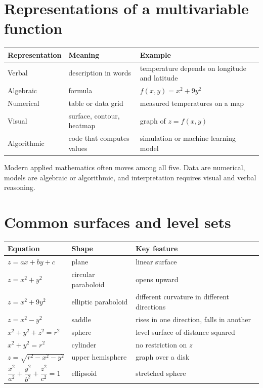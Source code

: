 \documentclass[11pt]{article}
\begin{document}
\section{Representations of a multivariable function}

\begin{center}
\begin{tabular}{@{}>{\raggedright\arraybackslash}p{}>{\raggedright\arraybackslash}p{}>{\raggedright\arraybackslash}p{}@{}}
\toprule
Representation & Meaning & Example \\
\midrule
Verbal & description in words & temperature depends on longitude and latitude \\
Algebraic & formula & $f(x,y)=x^2+9y^2$ \\
Numerical & table or data grid & measured temperatures on a map \\
Visual & surface, contour, heatmap & graph of $z=f(x,y)$ \\
Algorithmic & code that computes values & simulation or machine learning model \\
\bottomrule
\end{tabular}
\end{center}

Modern applied mathematics often moves among all five. Data are numerical, models are algebraic or algorithmic, and interpretation requires visual and verbal reasoning.

\section{Common surfaces and level sets}

\begin{center}
\begin{tabular}{@{}lll@{}}
\toprule
Equation & Shape & Key feature \\
\midrule
$z=ax+by+c$ & plane & linear surface \\
$z=x^2+y^2$ & circular paraboloid & opens upward \\
$z=x^2+9y^2$ & elliptic paraboloid & different curvature in different directions \\
$z=x^2-y^2$ & saddle & rises in one direction, falls in another \\
$x^2+y^2+z^2=r^2$ & sphere & level surface of distance squared \\
$x^2+y^2=r^2$ & cylinder & no restriction on $z$ \\
$z=\sqrt{r^2-x^2-y^2}$ & upper hemisphere & graph over a disk \\
$\dfrac{x^2}{a^2}+\dfrac{y^2}{b^2}+\dfrac{z^2}{c^2}=1$ & ellipsoid & stretched sphere \\
\bottomrule
\end{tabular}
\end{center}
\end{document}
